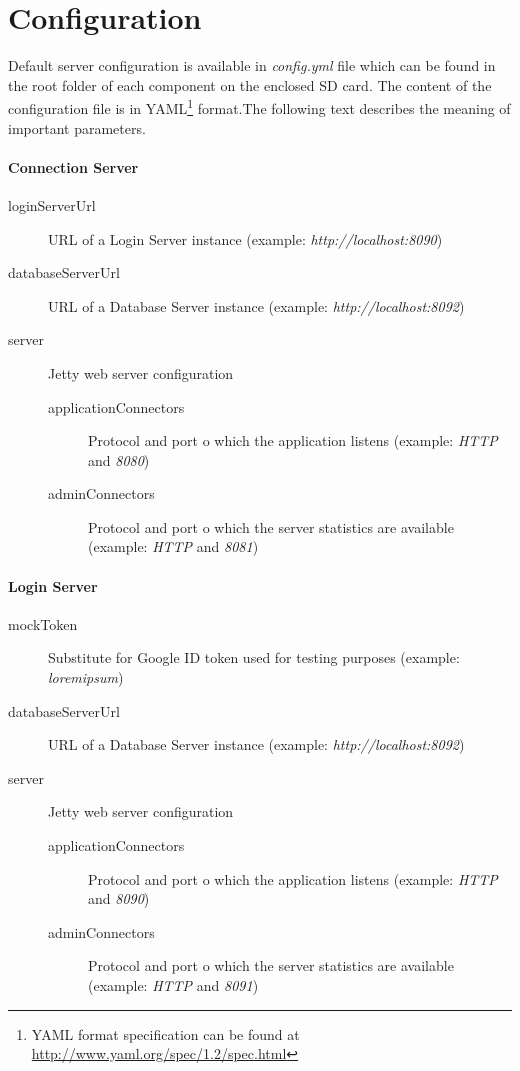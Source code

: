 \section{Configuration}
Default server configuration is available in \textit{config.yml} file which can be found in the root folder of each component on the enclosed SD card. The content of the configuration file is in YAML\footnote{YAML format specification can be found at \url{http://www.yaml.org/spec/1.2/spec.html}} format.The following text describes the meaning of important parameters.

\paragraph*{Connection Server}
\begin{description}
	\item[loginServerUrl] URL of a Login Server instance (example: \textit{http://localhost:8090})
	\item[databaseServerUrl] URL of a Database Server instance (example: \textit{http://localhost:8092})
	\item[server] Jetty web server configuration
		\begin{description}
			\item[applicationConnectors] Protocol and port o which the application listens (example: \textit{HTTP} and \textit{8080})
			\item[adminConnectors] Protocol and port o which the server statistics are available  (example: \textit{HTTP} and \textit{8081})
		\end{description}
\end{description}

\paragraph*{Login Server}
\begin{description}
	\item[mockToken] Substitute for Google ID token used for testing purposes (example: \textit{loremipsum})
	\item[databaseServerUrl] URL of a Database Server instance (example: \textit{http://localhost:8092})
	\item[server] Jetty web server configuration
	\begin{description}
		\item[applicationConnectors] Protocol and port o which the application listens (example: \textit{HTTP} and \textit{8090})
		\item[adminConnectors] Protocol and port o which the server statistics are available  (example: \textit{HTTP} and \textit{8091})
	\end{description}
\end{description}

